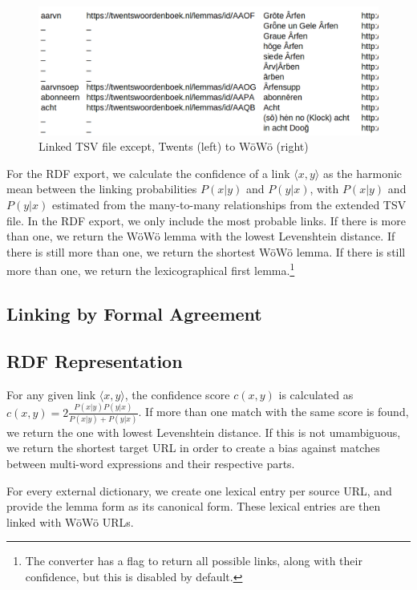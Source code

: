 \documentclass{article}
\begin{document}
\begin{figure}
    \centering
    \includegraphics[width=0.8\linewidth]{tsv-linked.png}
    \caption{Linked TSV file except, Twents (left) to WöWö (right)}
    \label{fig-twents-woewoe}
\end{figure}

For the RDF export, we calculate the confidence of a link $\langle x,y\rangle$ as the harmonic mean between the linking probabilities $P(x|y)$ and $P(y|x)$, with $P(x|y)$ and $P(y|x)$  estimated from the many-to-many relationships from the extended TSV file. In the RDF export, we only include the most probable links. If there is more than one, we return the WöWö lemma with the lowest Levenshtein distance. If there is still more than one, we return the shortest WöWö lemma. If there is still more than one, we return the lexicographical first lemma.\footnote{
    The converter has a flag to return all possible links, along with their confidence, but this is disabled by default.
}

\subsection{Linking by Formal Agreement}


\subsection{RDF Representation}

For any given link $\langle x,y\rangle$, the confidence score $c(x,y)$ is calculated as $c(x,y)=2 \frac{P(x|y) P(y|x)}{P(x|y) + P(y|x)}$. If more than one match with the same score is found, we return the one with lowest Levenshtein distance. If this is not umambiguous, we return the shortest target URL in order to create a bias against matches between multi-word expressions and their respective parts.

For every external dictionary, we create one lexical entry per source URL, and provide the lemma form as its canonical form. These lexical entries are then linked with WöWö URLs.
\end{document}
